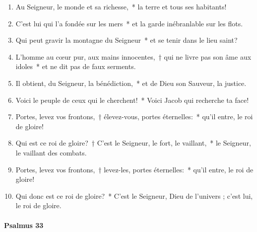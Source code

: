 \documentclass[twoside]{article}
\begin{document}
\begin{paracol}[1]{2}

\begin{enumerate}[wide, itemsep=0mm, labelwidth=!, labelindent=0pt, label=\color{gregoriocolor}\theenumi]
\item Au Seigneur, le monde et sa richesse,~* la terre et tous ses habitants!
\item C'est lui qui l'a fondée sur les mers~* et la garde inébranlable sur les flots.
\item Qui peut gravir la montagne du Seigneur~* et se tenir dans le lieu saint?
\item L'homme au cœur pur, aux mains innocentes,~† qui ne livre pas son âme aux idoles~* et ne dit pas de faux serments.
\item Il obtient, du Seigneur, la bénédiction,~* et de Dieu son Sauveur, la justice.
\item Voici le peuple de ceux qui le cherchent!~* Voici Jacob qui recherche ta face!
\item Portes, levez vos frontons,~† élevez-vous, portes éternelles:~* qu'il entre, le roi de gloire!
\item Qui est ce roi de gloire?~† C'est le Seigneur, le fort, le vaillant,~* le Seigneur, le vaillant des combats.
\item Portes, levez vos frontons,~† levez-les, portes éternelles:~* qu'il entre, le roi de gloire!
\item Qui donc est ce roi de gloire?~* C'est le Seigneur, Dieu de l'univers ; c'est lui, le roi de gloire.
\end{enumerate}
\newpage
\switchcolumn*

\paragraph{Psalmus 33}



\end{paracol}
\end{document}
